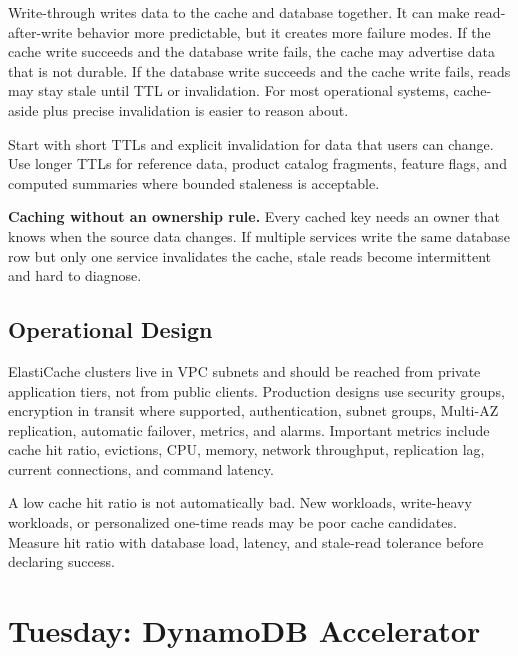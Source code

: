 Write-through writes data to the cache and database together. It can make read-after-write behavior more predictable, but it creates more failure modes. If the cache write succeeds and the database write fails, the cache may advertise data that is not durable. If the database write succeeds and the cache write fails, reads may stay stale until TTL or invalidation. For most operational systems, cache-aside plus precise invalidation is easier to reason about.
\begin{tipbox}
Start with short TTLs and explicit invalidation for data that users can change. Use longer TTLs for reference data, product catalog fragments, feature flags, and computed summaries where bounded staleness is acceptable.
\end{tipbox}
\begin{pitfall}
\textbf{Caching without an ownership rule.} Every cached key needs an owner that knows when the source data changes. If multiple services write the same database row but only one service invalidates the cache, stale reads become intermittent and hard to diagnose.
\end{pitfall}
\subsection{Operational Design}
ElastiCache clusters live in VPC subnets and should be reached from private application tiers, not from public clients. Production designs use security groups, encryption in transit where supported, authentication, subnet groups, Multi-AZ replication, automatic failover, metrics, and alarms. Important metrics include cache hit ratio, evictions, CPU, memory, network throughput, replication lag, current connections, and command latency.
\begin{notebox}
A low cache hit ratio is not automatically bad. New workloads, write-heavy workloads, or personalized one-time reads may be poor cache candidates. Measure hit ratio with database load, latency, and stale-read tolerance before declaring success.
\end{notebox}
\section{Tuesday: DynamoDB Accelerator}
